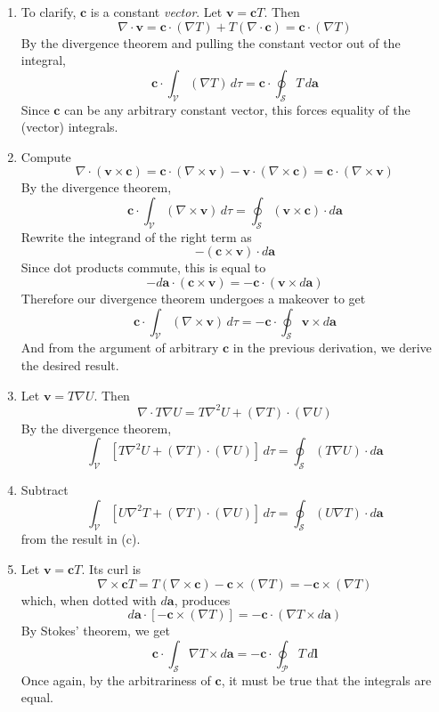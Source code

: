 \documentclass[a4paper]{article}
\begin{document}
\begin{enumerate}[label=(\alph*)]
	\item To clarify, \( \pmb{c} \) is a constant \textit{vector}. Let \( \pmb{v} = \pmb{c}T \). Then 
	\[ 
		\nabla \cdot \pmb{v} = \pmb{c} \cdot \!\left( \nabla T \right) + T \!\left( \nabla \cdot \pmb{c} \right) = \pmb{c} \cdot \!\left( \nabla T \right)
	\]
	By the divergence theorem and pulling the constant vector out of the integral,
	\[
		\pmb{c} \cdot \int_{\mathcal{V}} \!\left( \nabla T \right) \, d \tau = \pmb{c} \cdot \oint_{\mathcal{S}} T \, d \pmb{a} 
	\]
	Since \( \pmb{c} \) can be any arbitrary constant vector, this forces equality of the (vector) integrals.
	\item Compute
	\[
		\nabla \cdot \!\left( \pmb{v} \times \pmb{c} \right) = \pmb{c} \cdot \!\left( \nabla \times \pmb{v} \right) - \pmb{v} \cdot \!\left( \nabla \times \pmb{c} \right) = \pmb{c} \cdot \!\left( \nabla \times \pmb{v} \right) 
	\]
	By the divergence theorem,
	\[
		\pmb{c} \cdot \int_{\mathcal{V}} \!\left( \nabla \times \pmb{v} \right) \, d \tau = \oint_{\mathcal{S}} \!\left( \pmb{v} \times \pmb{c} \right) \cdot d \pmb{a} 
	\]
	Rewrite the integrand of the right term as 
	\[
		-\!\left( \pmb{c} \times \pmb{v} \right) \cdot d \pmb{a} 
	\]
	Since dot products commute, this is equal to
	\[
		-d \pmb{a} \cdot \!\left( \pmb{c} \times \pmb{v} \right) = -\pmb{c} \cdot \!\left( \pmb{v} \times d \pmb{a} \right)
	\]
	Therefore our divergence theorem undergoes a makeover to get
	\[
		\pmb{c} \cdot \int_{\mathcal{V}} \!\left( \nabla \times \pmb{v} \right) \, d \tau = -\pmb{c} \cdot \oint_{\mathcal{S}} \pmb{v} \times d \pmb{a}  
	\]
	And from the argument of arbitrary \( \pmb{c} \) in the previous derivation, we derive the desired result.
	\item Let \( \pmb{v} = T \nabla U \). Then
	\[
		\nabla \cdot T \nabla U = T \nabla^{2}U + \!\left( \nabla T \right) \cdot \!\left( \nabla U \right)
	\]
	By the divergence theorem,
	\[
		\int_{\mathcal{V}} \!\left[ T \nabla^{2}U + \!\left( \nabla T \right) \cdot \!\left( \nabla U \right) \right] \, d \tau = \oint_{\mathcal{S}} \!\left( T \nabla U \right) \cdot d \pmb{a} 
	\]
	\item Subtract
	\[
		\int_{\mathcal{V}} \!\left[ U \nabla^{2}T + \!\left( \nabla T \right) \cdot \!\left( \nabla U \right) \right] \, d \tau = \oint_{\mathcal{S}} \!\left( U \nabla T \right) \cdot d \pmb{a} 
	\]
	from the result in (c).
	\item Let \( \pmb{v} = \pmb{c}T \). Its curl is
	\[
		\nabla \times \pmb{c}T = T \!\left( \nabla \times \pmb{c} \right) - \pmb{c} \times \!\left( \nabla T \right) = -\pmb{c} \times \!\left( \nabla T \right)
	\]
	which, when dotted with \( d \pmb{a} \), produces
	\[
		d \pmb{a} \cdot \!\left[ -\pmb{c} \times \!\left( \nabla T \right) \right] = - \pmb{c} \cdot \!\left( \nabla T \times d \pmb{a} \right)
	\]
	By Stokes' theorem, we get
	\[
		\pmb{c} \cdot \int_{\mathcal{S}} \nabla T \times d \pmb{a} = -\pmb{c} \cdot \oint_{\mathcal{P}} T \, d \pmb{l}
	\]
	Once again, by the arbitrariness of \( \pmb{c} \), it must be true that the integrals are equal.
\end{enumerate}
\end{document}
